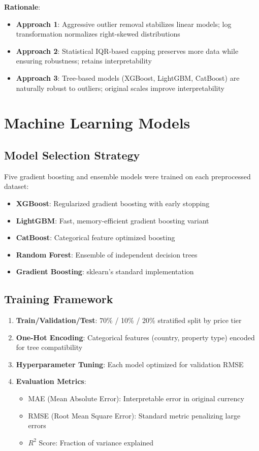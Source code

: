 \documentclass[12pt,a4paper]{article}
\begin{document}
\textbf{Rationale}:
\begin{itemize}
    \item \textbf{Approach 1}: Aggressive outlier removal stabilizes linear models; log transformation normalizes right-skewed distributions
    \item \textbf{Approach 2}: Statistical IQR-based capping preserves more data while ensuring robustness; retains interpretability
    \item \textbf{Approach 3}: Tree-based models (XGBoost, LightGBM, CatBoost) are naturally robust to outliers; original scales improve interpretability
\end{itemize}

\section{Machine Learning Models}

\subsection{Model Selection Strategy}

Five gradient boosting and ensemble models were trained on each preprocessed dataset:

\begin{itemize}
    \item \textbf{XGBoost}: Regularized gradient boosting with early stopping
    \item \textbf{LightGBM}: Fast, memory-efficient gradient boosting variant
    \item \textbf{CatBoost}: Categorical feature optimized boosting
    \item \textbf{Random Forest}: Ensemble of independent decision trees
    \item \textbf{Gradient Boosting}: sklearn's standard implementation
\end{itemize}

\subsection{Training Framework}

\begin{enumerate}
    \item \textbf{Train/Validation/Test}: 70\% / 10\% / 20\% stratified split by price tier
    \item \textbf{One-Hot Encoding}: Categorical features (country, property type) encoded for tree compatibility
    \item \textbf{Hyperparameter Tuning}: Each model optimized for validation RMSE
    \item \textbf{Evaluation Metrics}: 
    \begin{itemize}
        \item MAE (Mean Absolute Error): Interpretable error in original currency
        \item RMSE (Root Mean Square Error): Standard metric penalizing large errors
        \item $R^2$ Score: Fraction of variance explained
    \end{itemize}
\end{enumerate}
\end{document}
